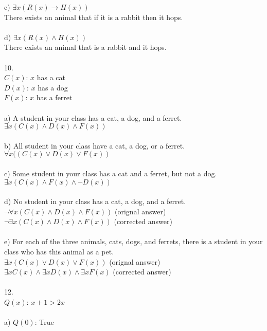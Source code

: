 \documentclass[11pt, oneside]{article}   	%
\begin{document}
\indent c) $\exists x(R(x) \to H(x))$\\
\indent There exists an animal that if it is a rabbit then it hops. \\\\
\indent d) $\exists x(R(x) \wedge H(x))$\\
\indent There exists an animal that is a rabbit and it hops. \\\\
10. \\
$C(x)$: $x$ has a cat\\$D(x)$: $x$ has a dog\\$F(x)$: $x$ has a ferret\\\\
\indent a) A student in your class has a cat, a dog, and a ferret.\\
\indent $\exists x(C(x)\wedge D(x)\wedge F(x))$\\\\
\indent b) All student in your class have a cat, a dog, or a ferret.\\
\indent $\forall x ((C(x)\lor D(x)\lor F(x))$\\\\
\indent c) Some student in your class has a cat and a ferret, but not a dog.\\
\indent $\exists x(C(x)\wedge F(x)\wedge\neg D(x))$\\\\
\indent d) No student in your class has a cat, a dog, and a ferret. \\
\indent $\neg\forall x(C(x)\wedge D(x)\wedge F(x))$ (orignal answer)\\
\indent $\neg\exists x(C(x)\wedge D(x)\wedge F(x))$ (corrected answer)\\\\
\indent e) For each of the three animals, cats, dogs, and ferrets, there is a student in your\\
\indent\hspace{3.1mm} class who has this animal as a pet. \\
\indent $\exists x(C(x)\lor D(x)\lor F(x))$ (orignal answer)\\
\indent $\exists xC(x)\wedge\exists xD(x)\wedge\exists xF(x)$ (corrected answer)\\\\
12. \\
$Q(x)$: $x + 1 > 2x$\\\\
\indent a) $Q(0)$: True\\
\end{document}
